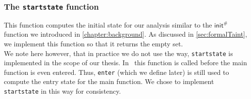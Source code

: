       \subsubsection{The \texttt{startstate} function}
        This function computes the initial state for our analysis similar to the $\textsf{init}^{\#}$ function we introduced in \autoref{chapter:background}. As discussed in \autoref{sec:formalTaint}, we implement this function so that it returns the empty set.\\
        We note here however, that in practice we do not use the way, \texttt{startstate} is implemented in the scope of our thesis. In \gob\ this function is called before the main function is even entered. Thus, \texttt{enter} (which we define later) is still used to compute the entry state for the main function. We chose to implement \texttt{startstate} in this way for consistency.

